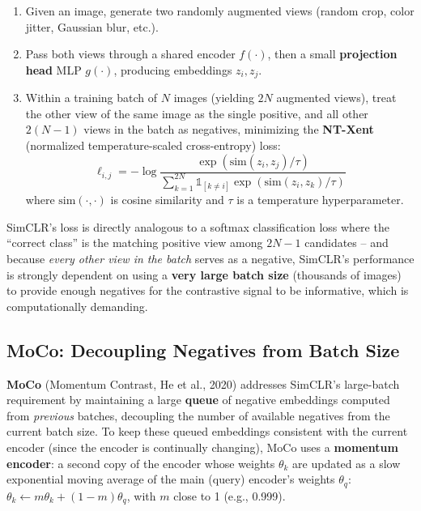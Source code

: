 \documentclass[12pt,a4paper]{article}
\begin{document}
\begin{enumerate}[leftmargin=1.5em]
    \item Given an image, generate two randomly augmented views (random crop, color jitter, Gaussian blur, etc.).
    \item Pass both views through a shared encoder $f(\cdot)$, then a small \textbf{projection head} MLP $g(\cdot)$, producing embeddings $z_i, z_j$.
    \item Within a training batch of $N$ images (yielding $2N$ augmented views), treat the other view of the same image as the single positive, and all other $2(N-1)$ views in the batch as negatives, minimizing the \textbf{NT-Xent} (normalized temperature-scaled cross-entropy) loss:
\[
\ell_{i,j} = -\log \frac{\exp(\text{sim}(z_i,z_j)/\tau)}{\sum_{k=1}^{2N} \mathbb{1}_{[k\neq i]}\exp(\text{sim}(z_i,z_k)/\tau)}
\]
where $\text{sim}(\cdot,\cdot)$ is cosine similarity and $\tau$ is a temperature hyperparameter.
\end{enumerate}

\begin{keyidea}
SimCLR's loss is directly analogous to a softmax classification loss where the ``correct class'' is the matching positive view among $2N-1$ candidates -- and because \emph{every other view in the batch} serves as a negative, SimCLR's performance is strongly dependent on using a \textbf{very large batch size} (thousands of images) to provide enough negatives for the contrastive signal to be informative, which is computationally demanding.
\end{keyidea}

\subsection{MoCo: Decoupling Negatives from Batch Size}

\begin{defbox}
\textbf{MoCo} (Momentum Contrast, He et al., 2020) addresses SimCLR's large-batch requirement by maintaining a large \textbf{queue} of negative embeddings computed from \emph{previous} batches, decoupling the number of available negatives from the current batch size. To keep these queued embeddings consistent with the current encoder (since the encoder is continually changing), MoCo uses a \textbf{momentum encoder}: a second copy of the encoder whose weights $\theta_k$ are updated as a slow exponential moving average of the main (query) encoder's weights $\theta_q$: $\theta_k \leftarrow m\theta_k + (1-m)\theta_q$, with $m$ close to 1 (e.g., 0.999).
\end{defbox}
\end{document}
